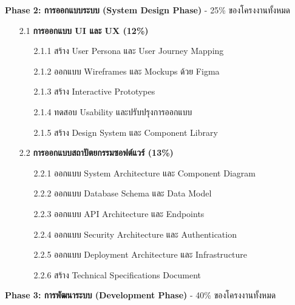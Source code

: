 \documentclass[12pt,a4paper]{article}
\newcommand{\textlight}[1]{{\thailightfont #1}}
\begin{document}
\begin{enumerate}[leftmargin=2cm]
{        \textbf{Phase 2: การออกแบบระบบ (System Design Phase)} \textlight{- 25\% ของโครงงานทั้งหมด}

        \begin{enumerate}
            \item[2.1] \textbf{การออกแบบ UI และ UX (12\%)}
            \begin{enumerate}
                \item[2.1.1] สร้าง User Persona และ User Journey Mapping
                \item[2.1.2] ออกแบบ Wireframes และ Mockups ด้วย Figma
                \item[2.1.3] สร้าง Interactive Prototypes
                \item[2.1.4] ทดสอบ Usability และปรับปรุงการออกแบบ
                \item[2.1.5] สร้าง Design System และ Component Library
            \end{enumerate}
            
            \item[2.2] \textbf{การออกแบบสถาปัตยกรรมซอฟต์แวร์ (13\%)}
            \begin{enumerate}
                \item[2.2.1] ออกแบบ System Architecture และ Component Diagram
                \item[2.2.2] ออกแบบ Database Schema และ Data Model
                \item[2.2.3] ออกแบบ API Architecture และ Endpoints
                \item[2.2.4] ออกแบบ Security Architecture และ Authentication
                \item[2.2.5] ออกแบบ Deployment Architecture และ Infrastructure
                \item[2.2.6] สร้าง Technical Specifications Document
            \end{enumerate}
        \end{enumerate}

        \vspace{2.5cm}

        \textbf{Phase 3: การพัฒนาระบบ (Development Phase)} \textlight{- 40\% ของโครงงานทั้งหมด}

}
\end{enumerate}
\end{document}
